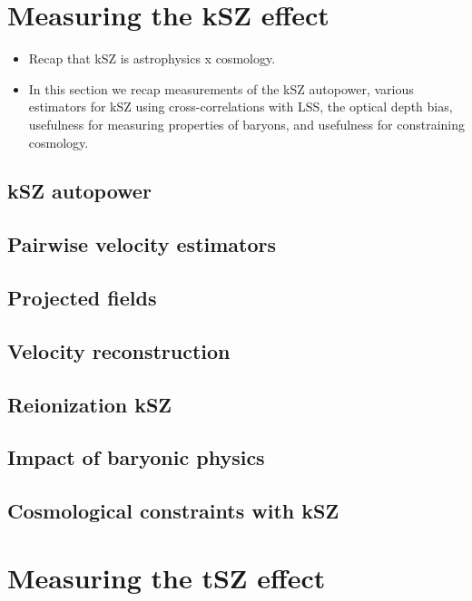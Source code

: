\documentclass[aps,nofootinbib,groupedaddress]{revtex4}
\begin{document}
\section{Measuring the kSZ effect}

\begin{itemize}
\item Recap that kSZ is astrophysics x cosmology.
\item In this section we recap measurements of the kSZ autopower, various estimators for kSZ using cross-correlations with LSS, the optical depth bias, usefulness for measuring properties of baryons, and usefulness for constraining cosmology.  
\end{itemize}

\subsection{kSZ autopower}

\subsection{Pairwise velocity estimators}

\subsection{Projected fields}

\subsection{Velocity reconstruction}

\subsection{Reionization kSZ}

\subsection{Impact of baryonic physics}

\subsection{Cosmological constraints with kSZ}


\section{Measuring the tSZ effect}
\end{document}
